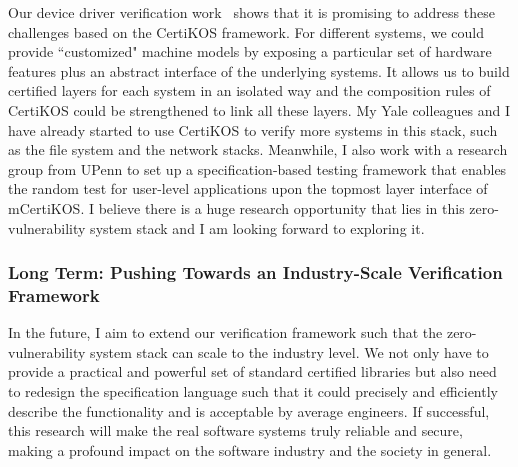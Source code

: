 \documentclass[a4paper, 10pt]{article}
\begin{document}
\begin{small}
Our device driver verification work~\cite{pldi16-device} shows that
it is promising to address these challenges based on the CertiKOS framework. For different systems, we could
provide ``customized" machine models
by exposing a particular set of hardware features
plus an abstract interface of the underlying systems.
It allows us to build certified layers for each system
in an isolated way and the  composition rules of CertiKOS
could be strengthened to link all these layers. My Yale colleagues
and I have already started to use CertiKOS to verify more systems in this stack,
such as the file system and the network stacks.
Meanwhile, I also work with  a research group from UPenn to
set up a specification-based testing framework
that enables the random test for user-level applications upon the topmost layer interface of mCertiKOS.
I believe there is a huge research opportunity that
lies in this zero-vulnerability system stack
and I am looking forward to exploring it.


\subsubsection*{\small Long Term: Pushing Towards  an Industry-Scale Verification Framework}
In the future, I aim to 
extend our verification framework such that
the  zero-vulnerability system stack can scale to the industry level. We not only have to provide a practical and powerful
set of standard certified libraries but also need to redesign
the specification language such that
it could precisely and efficiently describe the functionality
and is acceptable by average engineers.
If successful,
this research will make
the real software systems truly reliable and secure, making  a profound impact on the software industry
 and the society in general.
 
\vspace{0.5cm}

\end{small}
\end{document}
